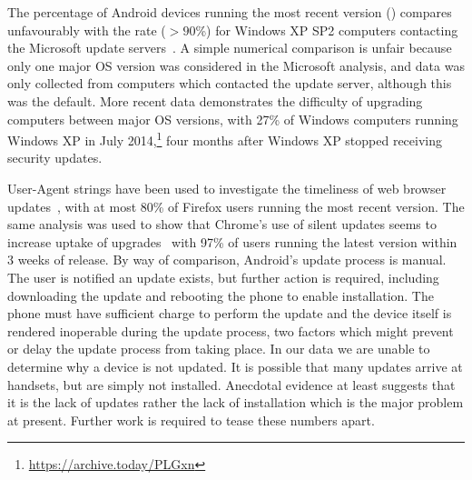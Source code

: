 \documentclass[conference,a4paper,twoside]{IEEEtran}
\begin{document}
The percentage of Android devices running the most recent version (\daUpdatednessPerc) compares unfavourably with the rate ($>90$\%) for Windows XP SP2 computers contacting the Microsoft update servers~\cite{Gkantsidis2006}.
A simple numerical comparison is unfair because only one major OS version was considered in the Microsoft analysis, and data was only collected from computers which contacted the update server, although this was the default.
More recent data demonstrates the difficulty of upgrading computers between major OS versions, with 27\% of Windows computers running Windows XP in July 2014,\footnote{\url{https://archive.today/PLGxn}} four months after Windows XP stopped receiving security updates.

User-Agent strings have been used to investigate the timeliness of web browser updates~\cite{Frei2008}, with at most 80\% of Firefox users running the most recent version.
The same analysis was used to show that Chrome's use of silent updates seems to increase uptake of upgrades~\cite{Duebendorfer2010} with 97\% of users running the latest version within 3 weeks of release.
By way of comparison, Android's update process is manual.
The user is notified an update exists, but further action is required, including downloading the update and rebooting the phone to enable installation.
The phone must have sufficient charge to perform the update and the device itself is rendered inoperable during the update process, two factors which might prevent or delay the update process from taking place.
In our data we are unable to determine why a device is not updated. 
It is possible that many updates arrive at handsets, but are simply not installed.
Anecdotal evidence at least suggests that it is the lack of updates rather the lack of installation which is the major problem at present. Further work is required to tease these numbers apart.
\end{document}
